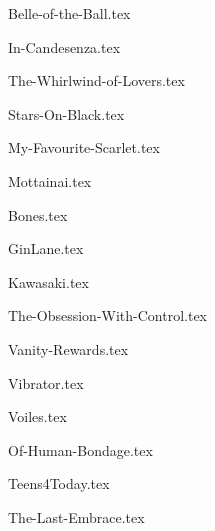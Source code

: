 \begin{songs}{}

  {Belle-of-the-Ball.tex}
  \sclearpage

  {In-Candesenza.tex}
  \sclearpage

  {The-Whirlwind-of-Lovers.tex}
  \sclearpage

  {Stars-On-Black.tex}
  \sclearpage

  {My-Favourite-Scarlet.tex}
  \sclearpage

  {Mottainai.tex}
  \sclearpage

  {Bones.tex}
  \sclearpage

  {GinLane.tex}
  \sclearpage

  {Kawasaki.tex}
  \sclearpage

  {The-Obsession-With-Control.tex}
  \sclearpage

  {Vanity-Rewards.tex}
  \sclearpage

  {Vibrator.tex}
  \sclearpage

  {Voiles.tex}
  \sclearpage

  {Of-Human-Bondage.tex}
  \sclearpage

  {Teens4Today.tex}
  \sclearpage

  {The-Last-Embrace.tex}
  \sclearpage
\end{songs}

